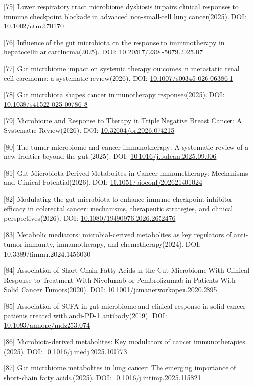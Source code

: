 {[}75{]} Lower respiratory tract microbiome dysbiosis impairs clinical responses to immune checkpoint blockade in advanced non-small-cell lung cancer(2025). DOI: \url{10.1002/ctm2.70170}

{[}76{]} Influence of the gut microbiota on the response to immunotherapy in hepatocellular carcinoma(2025). DOI: \url{10.20517/2394-5079.2025.07}

{[}77{]} Gut microbiome impact on systemic therapy outcomes in metastatic renal cell carcinoma: a systematic review(2026). DOI: \url{10.1007/s00345-026-06386-1}

{[}78{]} Gut microbiota shapes cancer immunotherapy responses(2025). DOI: \url{10.1038/s41522-025-00786-8}

{[}79{]} Microbiome and Response to Therapy in Triple Negative Breast Cancer: A Systematic Review(2026). DOI: \url{10.32604/or.2026.074215}

{[}80{]} The tumor microbiome and cancer immunotherapy: A systematic review of a new frontier beyond the gut.(2025). DOI: \url{10.1016/j.bulcan.2025.09.006}

{[}81{]} Gut Microbiota-Derived Metabolites in Cancer Immunotherapy: Mechanisms and Clinical Potential(2026). DOI: \url{10.1051/bioconf/202621401024}

{[}82{]} Modulating the gut microbiota to enhance immune checkpoint inhibitor efficacy in colorectal cancer: mechanisms, therapeutic strategies, and clinical perspectives(2026). DOI: \url{10.1080/19490976.2026.2652476}

{[}83{]} Metabolic mediators: microbial-derived metabolites as key regulators of anti-tumor immunity, immunotherapy, and chemotherapy(2024). DOI: \url{10.3389/fimmu.2024.1456030}

{[}84{]} Association of Short-Chain Fatty Acids in the Gut Microbiome With Clinical Response to Treatment With Nivolumab or Pembrolizumab in Patients With Solid Cancer Tumors(2020). DOI: \url{10.1001/jamanetworkopen.2020.2895}

{[}85{]} Association of SCFA in gut microbiome and clinical response in solid cancer patients treated with andi-PD-1 antibody(2019). DOI: \url{10.1093/annonc/mdz253.074}

{[}86{]} Microbiota-derived metabolites: Key modulators of cancer immunotherapies.(2025). DOI: \url{10.1016/j.medj.2025.100773}

{[}87{]} Gut microbiome metabolites in lung cancer: The emerging importance of short-chain fatty acids.(2025). DOI: \url{10.1016/j.intimp.2025.115821}

